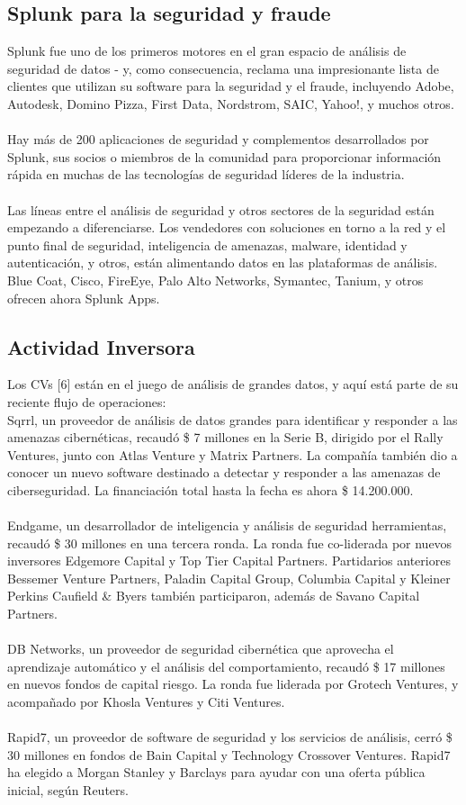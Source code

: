 \documentclass[journal]{IEEEtran}
\begin{document}
\subsection{Splunk para la seguridad y fraude}
Splunk fue uno de los primeros motores en el gran espacio de análisis de seguridad de datos - y, como consecuencia, reclama una impresionante lista de clientes que utilizan su software para la seguridad y el fraude, incluyendo Adobe, Autodesk, Domino Pizza, First Data, Nordstrom, SAIC, Yahoo!, y muchos otros.\\ \\
Hay más de 200 aplicaciones de seguridad y complementos desarrollados por Splunk, sus socios o miembros de la comunidad para proporcionar información rápida en muchas de las tecnologías de seguridad líderes de la industria.\\ \\
Las líneas entre el análisis de seguridad y otros sectores de la seguridad están empezando a diferenciarse. Los vendedores con soluciones en torno a la red y el punto final de seguridad, inteligencia de amenazas, malware, identidad y autenticación, y otros, están alimentando datos en las plataformas de análisis. Blue Coat, Cisco, FireEye, Palo Alto Networks, Symantec, Tanium, y otros ofrecen ahora Splunk Apps.
\subsection{Actividad Inversora}
Los CVs [6] están en el juego de análisis de grandes datos, y aquí está parte de su reciente flujo de operaciones:\\
Sqrrl, un proveedor de análisis de datos grandes para identificar y responder a las amenazas cibernéticas, recaudó \$ 7 millones en la Serie B, dirigido por el Rally Ventures, junto con Atlas Venture y Matrix Partners. La compañía también dio a conocer un nuevo software destinado a detectar y responder a las amenazas de ciberseguridad. La financiación total hasta la fecha es ahora \$ 14.200.000.\\ \\
Endgame, un desarrollador de inteligencia y análisis de seguridad herramientas, recaudó \$ 30 millones en una tercera ronda. La ronda fue co-liderada por nuevos inversores Edgemore Capital y Top Tier Capital Partners. Partidarios anteriores Bessemer Venture Partners, Paladin Capital Group, Columbia Capital y Kleiner Perkins Caufield \& Byers también participaron, además de Savano Capital Partners.\\ \\
DB Networks, un proveedor de seguridad cibernética que aprovecha el aprendizaje automático y el análisis del comportamiento, recaudó \$ 17 millones en nuevos fondos de capital riesgo. La ronda fue liderada por Grotech Ventures, y acompañado por Khosla Ventures y Citi Ventures.\\ \\
Rapid7, un proveedor de software de seguridad y los servicios de análisis, cerró \$ 30 millones en fondos de Bain Capital y Technology Crossover Ventures. Rapid7 ha elegido a Morgan Stanley y Barclays para ayudar con una oferta pública inicial, según Reuters.
\end{document}
